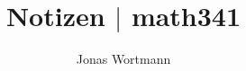 \documentclass[a4paper,12pt]{article}
\numberwithin{equation}{section}
\begin{document}

\title{Notizen $|$ math341}
\author{Jonas Wortmann}
\maketitle
{}


\newpage


\fancyhead[L]{\thepage}
\fancyfoot[C]{}

\tableofcontents


\newpage


\fancyhead[R]{\leftmark\\\rightmark}
\end{document}

